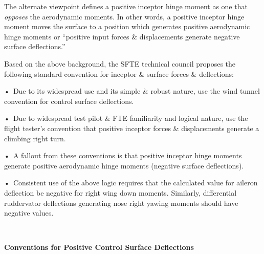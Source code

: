 \documentclass[
]{book}
\begin{document}
The alternate viewpoint defines a positive inceptor hinge moment as one that \emph{opposes} the aerodynamic moments. In other words, a positive inceptor hinge moment moves the surface to a position which generates positive aerodynamic hinge moments or ``positive input forces \& displacements generate negative surface deflections.''

Based on the above background, the SFTE technical council proposes the following standard convention for inceptor \& surface forces \& deflections:

•~Due to its widespread use and its simple \& robust nature, use the wind tunnel convention for control surface deflections.

•~Due to widespread test pilot \& FTE familiarity and logical nature, use the flight tester's convention that positive inceptor forces \& displacements generate a climbing right turn.

•~A fallout from these conventions is that positive inceptor hinge moments generate positive aerodynamic hinge moments (negative surface deflections).

•~Consistent use of the above logic requires that the calculated value for aileron deflection be negative for right wing down moments. Similarly, differential ruddervator deflections generating nose right yawing moments should have negative values.

\textbf{~}

\textbf{Conventions for Positive Control Surface Deflections}
\end{document}
